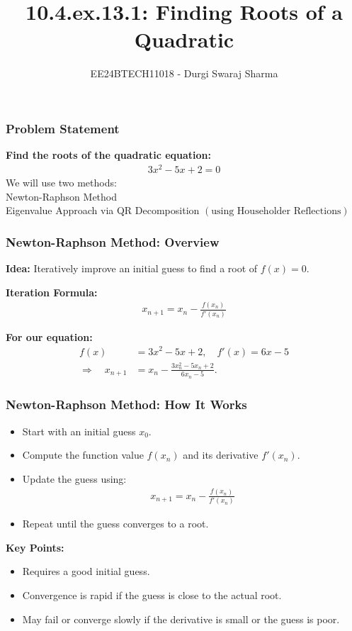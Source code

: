 \documentclass{beamer}
\title{10.4.ex.13.1: Finding Roots of a Quadratic}
\author{EE24BTECH11018 - Durgi Swaraj Sharma}
\date{}
\providecommand{\brak}[1]{\ensuremath{\left(#1\right)}}
\theoremstyle{remark}
\numberwithin{equation}{section}
\begin{document}
\frame{\titlepage}

\begin{frame}
\frametitle{Problem Statement}
\textbf{Find the roots of the quadratic equation:}
\begin{align}
3x^2 - 5x + 2 = 0
\end{align}
We will use two methods:\\
\quad Newton-Raphson Method\\
  \quad Eigenvalue Approach via QR Decomposition \brak{\text{using Householder Reflections}}
\end{frame}

\begin{frame}
\frametitle{Newton-Raphson Method: Overview}
\textbf{Idea:} Iteratively improve an initial guess to find a root of $f\brak{x}=0$.

\textbf{Iteration Formula:}
\begin{align}
x_{n+1} = x_n - \frac{f\brak{x_n}}{f'\brak{x_n}}
\end{align}

\textbf{For our equation:}
\begin{align}
f\brak{x} &= 3x^2 - 5x + 2,\quad f'\brak{x} = 6x - 5\\[1mm]
\Rightarrow \quad x_{n+1} &= x_n - \frac{3x_n^2 - 5x_n + 2}{6x_n - 5}.
\end{align}
\end{frame}

\begin{frame}
\frametitle{Newton-Raphson Method: How It Works}
\begin{itemize}
	\item Start with an initial guess $x_0$.
	\item Compute the function value $f\brak{x_n}$ and its derivative $f'\brak{x_n}$.
	\item Update the guess using:
	\begin{align}
	x_{n+1} = x_n - \frac{f\brak{x_n}}{f'\brak{x_n}}
	\end{align}
	\item Repeat until the guess converges to a root.
\end{itemize}
\textbf{Key Points:}
\begin{itemize}
	\item Requires a good initial guess.
	\item Convergence is rapid if the guess is close to the actual root.
	\item May fail or converge slowly if the derivative is small or the guess is poor.
\end{itemize}
\end{frame}
\end{document}
